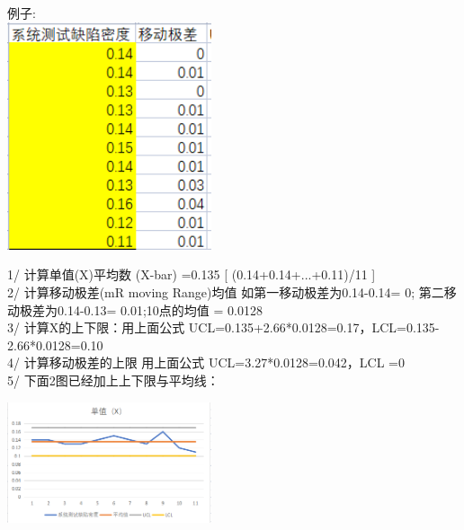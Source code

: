 \begin{description}
\item[]
\end{description}

例子:\\

\includegraphics[width=6cm]{微信截图_20210929131748.png}

1/ 计算单值(X)平均数 (X-bar) =0.135 {[} (0.14+0.14+...+0.11)/11 {]}\\
2/ 计算移动极差(mR moving Range)均值 如第一移动极差为0.14-0.14= 0;
第二移动极差为0.14-0.13= 0.01;10点的均值 = 0.0128\\
3/ 计算X的上下限：用上面公式
UCL=0.135+2.66*0.0128=0.17，LCL=0.135-2.66*0.0128=0.10\\
4/ 计算移动极差的上限 用上面公式 UCL=3.27*0.0128=0.042，LCL =0\\
5/ 下面2图已经加上上下限与平均线：



\includegraphics[width=6cm]{微信截图_20210927084548.png}

